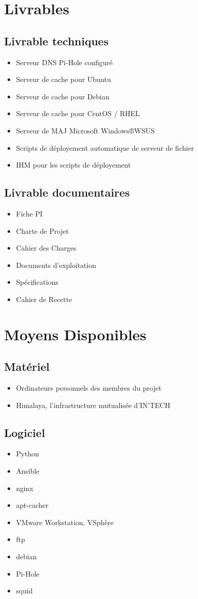 \documentclass[14pt,a4paper]{extarticle}
\newcommand{\windaube}{Microsoft Windows®}
\begin{document}
\section{Livrables}
\subsection{Livrable techniques}
\begin{itemize}
    \item{Serveur DNS Pi-Hole configuré}
    \item{Serveur de cache pour Ubuntu}
    \item{Serveur de cache pour Debian}
    \item{Serveur de cache pour CentOS / RHEL}
    \item{Serveur de MAJ \windaube WSUS}
    \item{Scripts de déployement automatique de serveur de fichier}
    \item{IHM pour les scripts de déployement}
\end{itemize}
\subsection{Livrable documentaires}
\begin{itemize}
    \item{Fiche PI}
    \item{Charte de Projet}
    \item{Cahier des Charges}
    \item{Documents d'exploitation}
    \item{Spécifications}
    \item{Cahier de Recette}
\end{itemize}
\break
\section{Moyens Disponibles}
\subsection{Matériel}
\begin{itemize}
    \item{Ordinateurs personnels des membres du projet}
    \item{Himalaya, l'infrastructure mutualisée d'IN'TECH}
\end{itemize}
\subsection{Logiciel}
\begin{itemize}
    \item{Python}
    \item{Ansible}
    \item{nginx}
    \item{apt-cacher}
    \item{VMware Workstation, VSphère}
    \item{ftp}
    \item{debian}
    \item{Pi-Hole}
    \item{squid}
\end{itemize}
\end{document}
